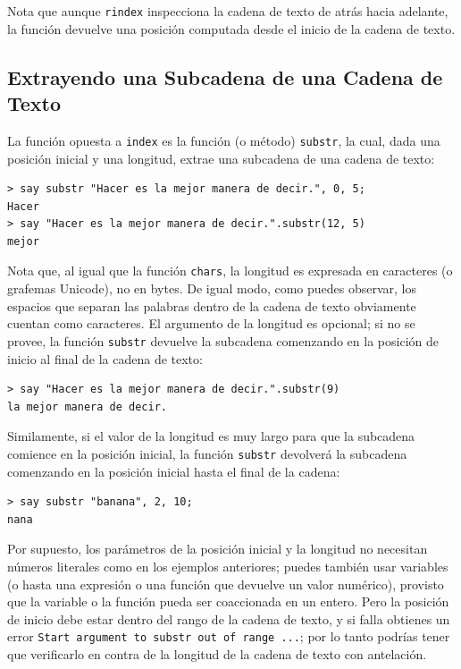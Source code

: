 Nota que aunque {\tt rindex} inspecciona la cadena de texto
de atrás hacia adelante, la función devuelve una posición
computada desde el inicio de la cadena de texto.

\subsection{Extrayendo una Subcadena de una Cadena de Texto}

La función opuesta a {\tt index} es la función (o método) {\tt substr},
la cual, dada una posición inicial y una longitud, extrae una subcadena
de una cadena de texto:

\begin{verbatim}
> say substr "Hacer es la mejor manera de decir.", 0, 5;
Hacer
> say "Hacer es la mejor manera de decir.".substr(12, 5)
mejor
\end{verbatim}
%

Nota que, al igual que la función {\tt chars}, la longitud es
expresada en caracteres (o grafemas Unicode), no en bytes.
De igual modo, como puedes observar, los espacios que separan
las palabras dentro de la cadena de texto obviamente cuentan 
como caracteres. El argumento de la longitud es opcional; 
si no se provee, la función {\tt substr} devuelve la subcadena
comenzando en la posición de inicio al final de la cadena de texto:

\begin{verbatim}
> say "Hacer es la mejor manera de decir.".substr(9)
la mejor manera de decir.
\end{verbatim}

Similamente, si el valor de la longitud es muy largo para que 
la subcadena comience en la posición inicial, la función
{\tt substr} devolverá la subcadena comenzando en la posición
inicial hasta el final de la cadena:

\begin{verbatim}
> say substr "banana", 2, 10;
nana
\end{verbatim}

Por supuesto, los parámetros de la posición inicial y la longitud 
no necesitan números literales como en los ejemplos anteriores; puedes
también usar variables (o hasta una expresión o una función que devuelve 
un valor numérico), provisto que la variable o la función pueda ser 
coaccionada en un entero. Pero la posición de inicio debe estar dentro 
del rango de la cadena de texto, y si falla obtienes un error 
{\tt Start argument to substr out of range ...}; por lo tanto
podrías tener que verificarlo en contra de la longitud de la 
cadena de texto con antelación.

